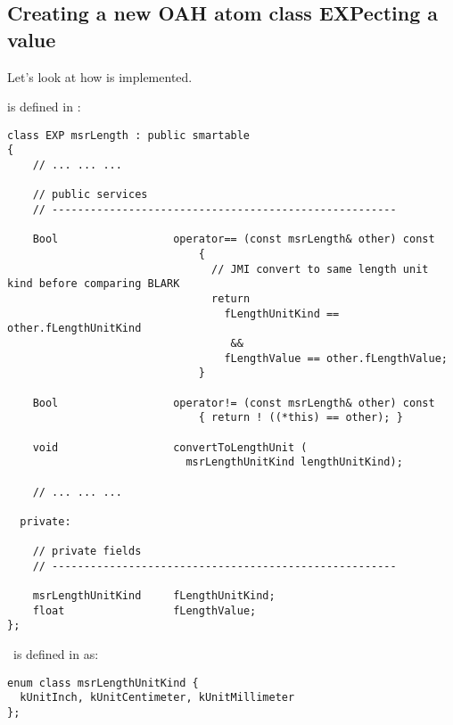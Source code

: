 \subsection{Creating a new OAH atom class EXPecting a value}

Let's look at how  is implemented.

 is defined in :
\begin{lstlisting}[language=CPlusPlus]
class EXP msrLength : public smartable
{
	// ... ... ...

    // public services
    // ------------------------------------------------------

    Bool                  operator== (const msrLength& other) const
                              {
                                // JMI convert to same length unit kind before comparing BLARK
                                return
                                  fLengthUnitKind == other.fLengthUnitKind
                                   &&
                                  fLengthValue == other.fLengthValue;
                              }

    Bool                  operator!= (const msrLength& other) const
                              { return ! ((*this) == other); }

    void                  convertToLengthUnit (
                            msrLengthUnitKind lengthUnitKind);

	// ... ... ...

  private:

    // private fields
    // ------------------------------------------------------

    msrLengthUnitKind     fLengthUnitKind;
    float                 fLengthValue;
};
\end{lstlisting}

\EnumType\ is defined in  as:
\begin{lstlisting}[language=CPlusPlus]
enum class msrLengthUnitKind {
  kUnitInch, kUnitCentimeter, kUnitMillimeter
};
\end{lstlisting}

